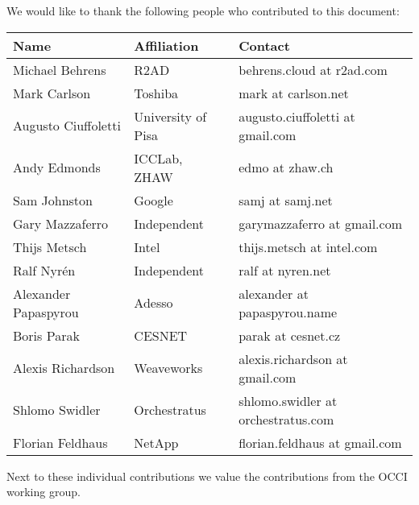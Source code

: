 
We would like to thank the following people who contributed to this
document:

\begin{tabular}{l|p{2in}|p{2in}}
Name & Affiliation & Contact \\
\hline
Michael Behrens & R2AD & behrens.cloud at r2ad.com \\
Mark Carlson & Toshiba & mark at carlson.net \\
Augusto Ciuffoletti & University of Pisa & augusto.ciuffoletti at gmail.com\\
Andy Edmonds & ICCLab, ZHAW & edmo at zhaw.ch \\
Sam Johnston & Google & samj at samj.net \\
Gary Mazzaferro & Independent &  garymazzaferro at gmail.com \\
Thijs Metsch & Intel & thijs.metsch at intel.com \\
Ralf Nyrén & Independent & ralf at nyren.net \\
Alexander Papaspyrou & Adesso & alexander at papaspyrou.name \\
Boris Parak & CESNET & parak at cesnet.cz \\
Alexis Richardson & Weaveworks & alexis.richardson at gmail.com \\
Shlomo Swidler & Orchestratus & shlomo.swidler at orchestratus.com \\
Florian Feldhaus & NetApp & florian.feldhaus at gmail.com \\
\end{tabular}

Next to these individual contributions we value the contributions from
the OCCI working group.
